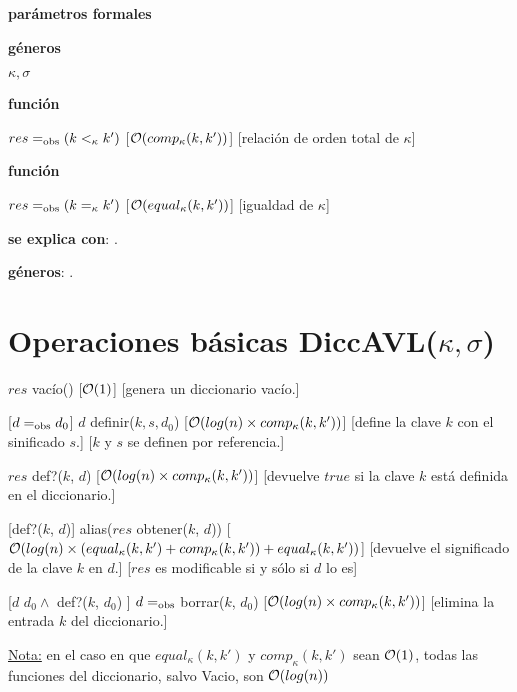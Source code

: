 \begin{Interfaz}
  \textbf{parámetros formales}\parindent\\
  \parbox{1.7cm}{\textbf{géneros}} $\kappa, \sigma$\\
  \parbox[t]{1.7cm}{\textbf{función}}\parbox[t]{\textwidth-2\parindent-1.7cm}{    	
    {$res =_{\mathrm{obs}} (k <_{\kappa} k')$}
    [$\mathcal{O}(comp_{\kappa}(k, k'))$]
    [relación de orden total de $\kappa$]
    }
        
   \parbox[t]{1.7cm}{\textbf{función}}\parbox[t]{\textwidth-2\parindent-1.7cm}{    	
    {$res =_{\mathrm{obs}} (k =_{\kappa} k')$}
    [$\mathcal{O}(equal_{\kappa}(k, k'))$]
    [igualdad de $\kappa$]
    }
    
  \textbf{se explica con}: .

  \textbf{géneros}: .

  \section*{Operaciones básicas DiccAVL($\kappa, \sigma$)}

  {$res$ \igobs vacío()}
  [$\mathcal{O}(1)$]
  [genera un diccionario vacío.]

  [$d =_{\mathrm{obs}} d_0$]  
  {$d$ \igobs definir($k, s, d_0$)}
  [$\mathcal{O}(log(n) \times comp_{\kappa}(k, k'))$]
  [define la clave $k$ con el sinificado $s$.]
  [$k$ y $s$ se definen por referencia.]
    
  {$res$ \igobs def?($k$, $d$) }
  [$\mathcal{O}(log(n) \times comp_{\kappa}(k, k'))$]
  [devuelve $true$ si la clave $k$ está definida en el diccionario.]
  
  [def?($k$, $d$)]  
  {alias($res$ \igobs obtener($k$, $d$))}
  [$\mathcal{O}(log(n) \times (equal_{\kappa}(k, k') + comp_{\kappa}(k, k')) + equal_{\kappa}(k, k'))$]
  [devuelve el significado de la clave $k$ en $d$.]
  [$res$ es modificable si y sólo si $d$ lo es]
  
  [$d$ \igobs $d_0 \land$ def?($k$, $d_0$) ]
  {$d =_{\mathrm{obs}}$ borrar($k$, $d_0$)}
  [$\mathcal{O}(log(n) \times comp_{\kappa}(k, k'))$]
  [elimina la entrada $k$ del diccionario.] 
  
  \underline{Nota:} en el caso en que $equal_{\kappa}(k, k')$ y $comp_{\kappa}(k, k')$ sean $\mathcal{O}(1)$, todas las funciones del diccionario, salvo Vacio, son $\mathcal{O}(log(n))$
  \clearpage
\end{Interfaz}


